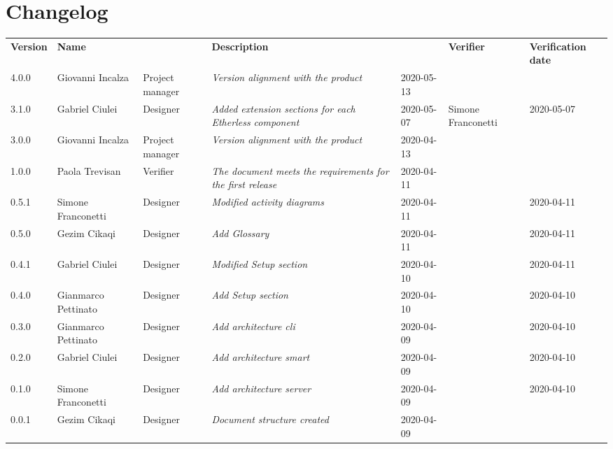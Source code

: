\section*{Changelog}
\renewcommand{\arraystretch}{1.8}
  \setlength\LTleft{-1.7cm}
  \begin{longtable}{|p{1.7cm}|p{2cm}|p{2.5cm}|p{3cm}|p{1.7cm}|p{2cm}|p{2.3cm}|}
    \hline
    \rowcolor{header}
    \textbf{Version} & \textbf{Name} & \centering{\textbf{Role}} & \textbf{Description} &      \centering{\textbf{Date}} & \textbf{Verifier} & \textbf{Verification date} \\
	4.0.0 & Giovanni Incalza & Project manager & \small{\textit{Version alignment with the product}} & 2020-05-13 &  & \\
 	3.1.0 & Gabriel Ciulei & Designer & \small{\textit{Added extension sections for each Etherless component}} & 2020-05-07 & Simone Franconetti & 2020-05-07\\
    3.0.0 & Giovanni Incalza & Project manager & \small{\textit{Version alignment with the product}} & 2020-04-13 &  & \\

    1.0.0 & Paola Trevisan & Verifier & \small{\textit{The document meets the requirements for the first release}} & 2020-04-11 &  & \\
    0.5.1 & Simone Franconetti & Designer & \small{\textit{Modified activity diagrams}} & 2020-04-11 &  & 2020-04-11\\
    0.5.0 & Gezim Cikaqi & Designer & \small{\textit{Add Glossary}} & 2020-04-11 &  & 2020-04-11\\
    0.4.1 & Gabriel Ciulei & Designer & \small{\textit{Modified Setup section}} & 2020-04-10 &  & 2020-04-11\\
    0.4.0 & Gianmarco Pettinato & Designer & \small{\textit{Add Setup section}} & 2020-04-10 &  & 2020-04-10\\
    0.3.0 & Gianmarco Pettinato & Designer & \small{\textit{Add architecture cli}} & 2020-04-09 &  & 2020-04-10\\
    0.2.0 & Gabriel Ciulei & Designer & \small{\textit{Add architecture smart}} & 2020-04-09 &  & 2020-04-10\\
    0.1.0 & Simone Franconetti & Designer & \small{\textit{Add architecture server}} & 2020-04-09 &  & 2020-04-10\\
    0.0.1 & Gezim Cikaqi & Designer & \small{\textit{Document structure created}} & 2020-04-09 &  & \\

    \hline
  \end{longtable}
\setlength\LTleft{0cm}
\restoregeometry
